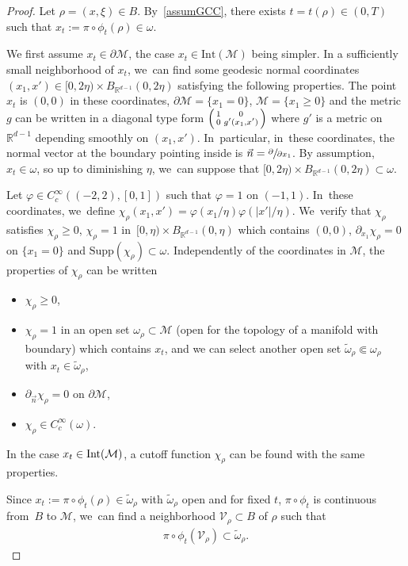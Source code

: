 \documentclass[10pt]{amsart}
\newenvironment{Smallpmatrix}{\Big(\begin{smallmatrix}}{\end{smallmatrix}\Big)}
\theoremstyle{definition}
\let\mc\mathcal
\newcommand{\M}{\mc{M}}
\newcommand{\R}{\mathbb{R}}
\providecommand{\Int}[1]{\textup{Int}(#1)}
\begin{document}
\begin{proof}
Let $\rho=(x, \xi)\in B$. By~\ref{assumGCC}, there exists $t=t(\rho)\in (0, T)$ such that $x_t:=\pi\circ\phi_t(\rho)\in \omega$.

We first assume $x_t\in \partial \M$, the case $x_t\in \text{Int}(\M)$ being simpler.
In a sufficiently small neighborhood of $x_t$, we~can find some geodesic normal coordinates $(x_1,x')\in [0,2\eta)\times B_{\R^{d-1}}(0,2\eta)$ satisfying the following properties.
The point $x_t$ is $(0,0)$ in these coordinates, $\partial \M=\{x_1=0\}$, $\M=\{x_1\geq 0\}$ and the metric $g$ can be written in a diagonal type form $\begin{Smallpmatrix}
1 & 0 \\
0 &g'(x_1,x')
\end{Smallpmatrix}$ where $g'$ is a metric on $\R^{d-1}$ depending smoothly on $(x_1,x')$. In~particular, in~these coordinates, the normal vector at the boundary pointing inside is $\vec n=\sfrac{\partial}{\partial x_1}$. By assumption, $x_t\in \omega$, so up to diminishing $\eta$, we~can suppose that $[0,2\eta)\times B_{\R^{d-1}}(0,2\eta)\subset \omega$.

Let $\varphi\in C^{\infty}_c((-2,2),[0,1])$ such that $\varphi=1$ on $(-1,1)$. In~these coordinates, we~define $\chi_{\rho}(x_{1},x')= \varphi(x_{1}/\eta)\varphi(|x'|/\eta)$. We~verify that $\chi_{\rho}$ satisfies $\chi_{\rho}\geq 0$, $\chi_{\rho}=1$ in~$[0,\eta)\times B_{\R^{d-1}}(0,\eta)$ which contains $(0,0)$, $\partial_{x_1}\chi_{\rho}=0$ on $\{x_1=0\}$ and $\text{Supp}(\chi_{\rho})\subset \omega$. Independently of the coordinates in $\M$, the properties of $\chi_{\rho}$ can be written
\begin{itemize}
\item $\chi_{\rho}\geq 0$,
\item $\chi_{\rho}=1$ in an open set $\omega_{\rho}\subset \M$ (open for the topology of a manifold with boundary) which contains $x_t$, and we can select another open set $\widetilde{\omega}_{\rho}\Subset \omega_{\rho}$ with $x_t\in \widetilde{\omega}_{\rho}$,
\item $\partial_{\vec n}\chi_{\rho}=0$ on $\partial \M$,
\item $\chi_{\rho}\in C^{\infty}_c(\omega)$.
\end{itemize}
In the case $x_t\in \Int{\M}$, a cutoff function $\chi_{\rho}$ can be found with the same properties.

Since $x_t:=\pi\circ\phi_t(\rho)\in \widetilde{\omega}_{\rho}$ with $\widetilde{\omega}_{\rho}$ open and for fixed $t$, $\pi\circ\phi_t$ is continuous from~$B$ to $\M$, we~can find a neighborhood $\mc{V}_{\rho}\subset B$ of $\rho$ such that
\begin{align}
\label{inclusflow}
\pi\circ\phi_t(\mc{V}_\rho)\subset\widetilde{\omega}_{\rho}.
\end{align}


\end{proof}
\end{document}
